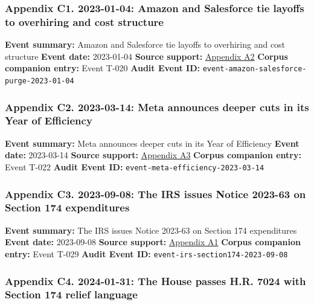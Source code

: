 \documentclass[
  american,
  11pt,
  letterpaper,
]{article}
\begin{document}
\subsubsection{Appendix C1. 2023-01-04: Amazon and Salesforce tie
layoffs to overhiring and cost
structure}\label{ch-05-appendix-c1-2023-01-04-amazon-and-salesforce-tie-layoffs-to-overhiring-and-cost-structure}

\textbf{Event summary:} Amazon and Salesforce tie layoffs to overhiring
and cost structure \textbf{Event date:} 2023-01-04 \textbf{Source
support:}
\hyperref[ch-05-appendix-a2-amazon-salesforce-jettison-jobs-in-latest-tech-worker-purge]{Appendix
A2} \textbf{Corpus companion entry:} Event T-020 \textbf{Audit Event
ID:} \texttt{event-amazon-salesforce-purge-2023-01-04}

\subsubsection{Appendix C2. 2023-03-14: Meta announces deeper cuts in
its Year of
Efficiency}\label{ch-05-appendix-c2-2023-03-14-meta-announces-deeper-cuts-in-its-year-of-efficiency}

\textbf{Event summary:} Meta announces deeper cuts in its Year of
Efficiency \textbf{Event date:} 2023-03-14 \textbf{Source support:}
\hyperref[ch-05-appendix-a3-mark-zuckerberg-s-message-to-meta-employees]{Appendix
A3} \textbf{Corpus companion entry:} Event T-022 \textbf{Audit Event
ID:} \texttt{event-meta-efficiency-2023-03-14}

\subsubsection{Appendix C3. 2023-09-08: The IRS issues Notice 2023-63 on
Section 174
expenditures}\label{ch-05-appendix-c3-2023-09-08-the-irs-issues-notice-2023-63-on-section-174-expenditures}

\textbf{Event summary:} The IRS issues Notice 2023-63 on Section 174
expenditures \textbf{Event date:} 2023-09-08 \textbf{Source support:}
\hyperref[ch-05-appendix-a1-notice-2023-63-guidance-on-section-174-and-specified-research-or-experimental-expenditures]{Appendix
A1} \textbf{Corpus companion entry:} Event T-029 \textbf{Audit Event
ID:} \texttt{event-irs-section174-2023-09-08}

\subsubsection{Appendix C4. 2024-01-31: The House passes H.R. 7024 with
Section 174 relief
language}\label{ch-05-appendix-c4-2024-01-31-the-house-passes-h-r-7024-with-section-174-relief-language}
\end{document}
